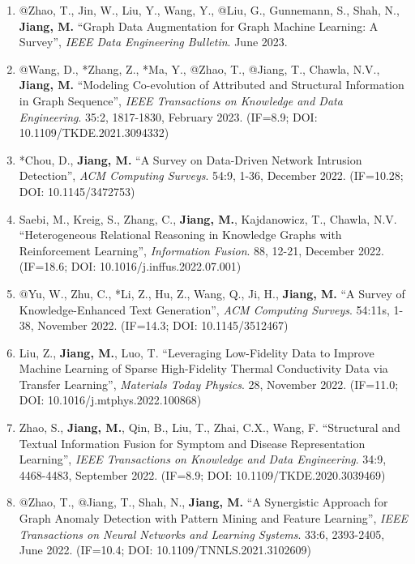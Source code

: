\documentclass[10pt]{article}
\newenvironment{myindentpar}[1]%
{\begin{list}{}%
         {\setlength{\leftmargin}{#1}}%
         \item[]%
}
{\end{list}}
\newcounter{list}
\begin{document}
\begin{myindentpar}{0.00cm}
\begin{enumerate}[leftmargin=.5cm]
\item[J33] @Zhao, T., Jin, W., Liu, Y., Wang, Y., @Liu, G., Gunnemann, S., Shah, N., \textbf{Jiang, M.} ``Graph Data Augmentation for Graph Machine Learning: A Survey'', \textit{IEEE Data Engineering Bulletin}. June 2023.
	
\item[J32] @Wang, D., *Zhang, Z., *Ma, Y., @Zhao, T., @Jiang, T., Chawla, N.V., \textbf{Jiang, M.} ``Modeling Co-evolution of Attributed and Structural Information in Graph Sequence'', \textit{IEEE Transactions on Knowledge and Data Engineering}. 35:2, 1817-1830, February 2023. (IF=8.9; DOI: 10.1109/TKDE.2021.3094332)

\item[J31] *Chou, D., \textbf{Jiang, M.} ``A Survey on Data-Driven Network Intrusion Detection'', \textit{ACM Computing Surveys}. 54:9, 1-36, December 2022. (IF=10.28; DOI: 10.1145/3472753)

\item[J30] Saebi, M., Kreig, S., Zhang, C., \textbf{Jiang, M.}, Kajdanowicz, T., Chawla, N.V. ``Heterogeneous Relational Reasoning in Knowledge Graphs with Reinforcement Learning'', \textit{Information Fusion}. 88, 12-21, December 2022. (IF=18.6; DOI: 10.1016/j.inffus.2022.07.001)
	
\item[J29] @Yu, W., Zhu, C., *Li, Z., Hu, Z., Wang, Q., Ji, H., \textbf{Jiang, M.} ``A Survey of Knowledge-Enhanced Text Generation'', \textit{ACM Computing Surveys}. 54:11s, 1-38, November 2022. (IF=14.3; DOI: 10.1145/3512467)

\item[J28] Liu, Z., \textbf{Jiang, M.}, Luo, T. ``Leveraging Low-Fidelity Data to Improve Machine Learning of Sparse High-Fidelity Thermal Conductivity Data via Transfer Learning'', \textit{Materials Today Physics}. 28, November 2022. (IF=11.0; DOI: 10.1016/j.mtphys.2022.100868)
	
\item[J27] Zhao, S., \textbf{Jiang, M.}, Qin, B., Liu, T., Zhai, C.X., Wang, F. ``Structural and Textual Information Fusion for Symptom and Disease Representation Learning'', \textit{IEEE Transactions on Knowledge and Data Engineering}. 34:9, 4468-4483, September 2022. (IF=8.9; DOI: 10.1109/TKDE.2020.3039469)

\item[J26] @Zhao, T., @Jiang, T., Shah, N., \textbf{Jiang, M.} ``A Synergistic Approach for Graph Anomaly Detection with Pattern Mining and Feature Learning'', \textit{IEEE Transactions on Neural Networks and Learning Systems}. 33:6, 2393-2405, June 2022. (IF=10.4; DOI: 10.1109/TNNLS.2021.3102609)


\end{enumerate}
\end{myindentpar}
\end{document}
